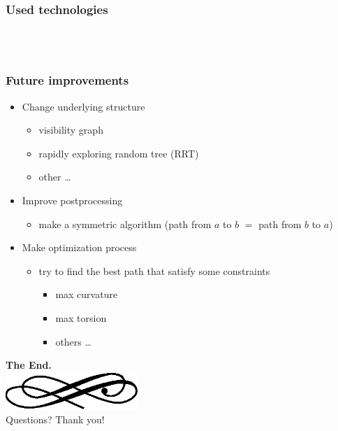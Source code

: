 \begin{frame}
  \frametitle{Used technologies}
  \begin{center}
    \\[1cm]
    \\[1cm]
  \end{center}
\end{frame}

\begin{frame}
  \frametitle{Future improvements}
  \begin{itemize}
  \item Change underlying \alert{structure}\pause
    \begin{itemize}
    \item visibility graph\pause
    \item rapidly exploring random tree (RRT)\pause
    \item other \dots\pause
    \end{itemize}
  \item Improve \alert{postprocessing}\pause
    \begin{itemize}
    \item make a \alert{symmetric} algorithm (path from $a$ to $b$ $=$ path
      from $b$ to $a$)\pause
    \end{itemize}
  \item Make \alert{optimization} process\pause
    \begin{itemize}
    \item try to find the best path that satisfy some constraints\pause
      \begin{itemize}
      \item max \alert{curvature}\pause
      \item max \alert{torsion}\pause
      \item others \dots
      \end{itemize}
    \end{itemize}
  \end{itemize}
\end{frame}

\begin{frame}
  \begin{center}
	\textbf{\calligra\Huge The End.}\\
  \includegraphics[width=5cm]{img/ornament.eps}\\[1cm]
	\pause
	{\huge\calligra Questions?\pause{} Thank you!}
  \end{center}
\end{frame}


